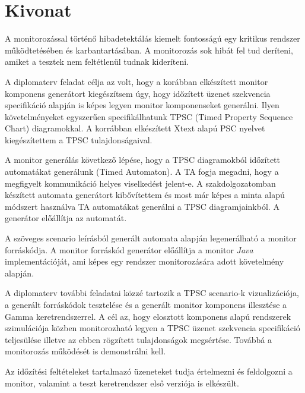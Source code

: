 \setcounter{page}{1}

\selecthungarian

\chapter*{Kivonat}

A monitorozással történő hibadetektálás kiemelt fontosságú egy kritikus rendszer működtetésében és karbantartásában.
A monitorozás sok hibát fel tud deríteni, amiket a tesztek nem feltétlenül tudnak kideríteni.

A diplomaterv feladat célja az volt, hogy a korábban elkészített monitor komponens generátort kiegészítsem úgy, hogy időzített üzenet szekvencia specifikáció alapján is képes legyen monitor komponenseket generálni.
Ilyen követelményeket egyszerűen specifikálhatunk TPSC (Timed Property Sequence Chart) diagramokkal. A korrábban elkészített Xtext alapú PSC nyelvet kiegészítettem a TPSC tulajdonságaival.

A monitor generálás következő lépése, hogy a TPSC diagramokból időzített automatákat generálunk (Timed Automaton).
A TA fogja megadni, hogy a megfigyelt kommunikáció helyes viselkedést jelent-e.
A szakdolgozatomban készített automata generátort kibővítettem és most már képes a minta alapú módszert használva TA automatákat generálni a TPSC diagramjainkból.
A generátor előállítja az automatát.

A szöveges scenario leírásból generált automata alapján legenerálható a monitor forráskódja.
A monitor forráskód generátor előállítja a monitor \textit{Java} implementációját, ami képes egy rendszer monitorozására adott követelmény alapján.

A diplomaterv további feladatai közzé tartozik a TPSC scenario-k vizualizációja, a generált forráskódok tesztelése és a generált monitor komponens illesztése a Gamma keretrendszerrel.
A cél az, hogy elosztott komponens alapú rendszerek szimulációja közben monitorozható legyen a TPSC üzenet szekvencia specifikáció teljesülése illetve az ebben rögzített tulajdonságok megsértése.
Továbbá a monitorozás működését is demonstrálni kell.

Az időzítési feltételeket tartalmazó üzeneteket tudja értelmezni és feldolgozni a monitor, valamint a teszt keretrendszer első verziója is elkészült.

